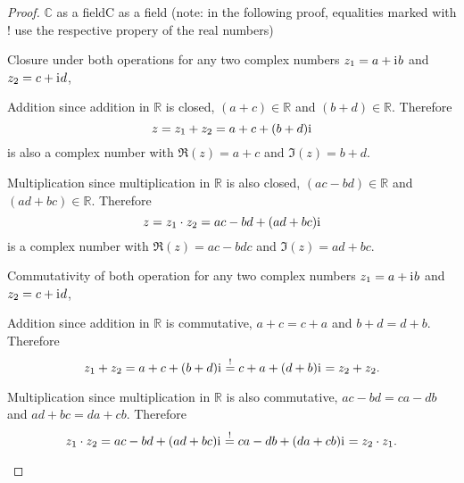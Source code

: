 \begin{proof}{$\bm{\mathbb{C}}$ as a field}{C as a field}
	(note: in the following proof, equalities marked with $!$ use the respective propery of the real numbers)

	\begin{descitemize}
		\item[Closure under both operations] for any two complex numbers $z_{1}=a+\mathrm{i}\mkern1mu b$ and $z_{2}=c+\mathrm{i}\mkern1mu d$,
			\begin{listitemize}
			\item[Addition] since addition in $\mathbb{R}$ is closed, $(a+c)\in\mathbb{R}$ and $(b+d)\in\mathbb{R}$. Therefore
				\[
					z = z_{1}+z_{2} = a+c + (b+d)\mathrm{i}\mkern1mu
				\]
				is also a complex number with $\Re(z)=a+c$ and $\Im(z)=b+d$.
			\item[Multiplication] since multiplication in $\mathbb{R}$ is also closed, $(ac-bd)\in\mathbb{R}$ and $(ad+bc)\in\mathbb{R}$. Therefore
				\[
					z = z_{1} \cdot z_{2} = ac-bd + (ad+bc)\mathrm{i}\mkern1mu
				\]
				is a complex number with $\Re(z)=ac-bdc$ and $\Im(z)=ad+bc$.
			\end{listitemize}
		
		\item[Commutativity of both operation] for any two complex numbers $z_{1}=a+\mathrm{i}\mkern1mu b$ and $z_{2}=c+\mathrm{i}\mkern1mu d$,
			\begin{listitemize}
			\item[Addition] since addition in $\mathbb{R}$ is commutative, $a+c=c+a$ and $b+d=d+b$. Therefore
				\[
					z_{1} + z_{2} = a+c + (b+d)\mathrm{i}\mkern1mu \overset{!}{=} c+a + (d+b)\mathrm{i}\mkern1mu = z_{2}+z_{2}.
				\]
			\item[Multiplication] since multiplication in $\mathbb{R}$ is also commutative, $ac-bd = ca-db$ and $ad+bc=da+cb$. Therefore
				\[
					z_{1} \cdot z_{2} = ac-bd + (ad+bc)\mathrm{i}\mkern1mu \overset{!}{=} ca-db + (da+cb)\mathrm{i}\mkern1mu = z_{2} \cdot z_{1}.
				\]
			\end{listitemize}
		

\end{descitemize}
\end{proof}
